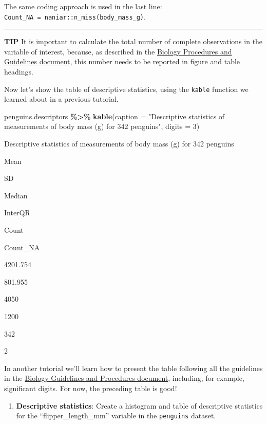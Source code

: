 \documentclass[
]{book}
\newenvironment{Shaded}{\begin{snugshade}}{\end{snugshade}}
\newcommand{\AttributeTok}[1]{\textcolor[rgb]{0.13,0.29,0.53}{#1}}
\newcommand{\DecValTok}[1]{\textcolor[rgb]{0.00,0.00,0.81}{#1}}
\newcommand{\FunctionTok}[1]{\textcolor[rgb]{0.13,0.29,0.53}{\textbf{#1}}}
\newcommand{\NormalTok}[1]{#1}
\newcommand{\SpecialCharTok}[1]{\textcolor[rgb]{0.81,0.36,0.00}{\textbf{#1}}}
\newcommand{\StringTok}[1]{\textcolor[rgb]{0.31,0.60,0.02}{#1}}
\providecommand{\tightlist}{%
  \setlength{\itemsep}{0pt}\setlength{\parskip}{0pt}}
\begin{document}
The same coding approach is used in the last line: \texttt{Count\_NA\ =\ naniar::n\_miss(body\_mass\_g)}.

\begin{center}\rule{0.5\linewidth}{0.5pt}\end{center}

\textbf{TIP}
It is important to calculate the total number of complete observations in the variable of interest, because, as described in the \href{https://ubco-biology.github.io/Procedures-and-Guidelines/figures-tables.html}{Biology Procedures and Guidelines document}, this number needs to be reported in figure and table headings.

Now let's show the table of descriptive statistics, using the \texttt{kable} function we learned about in a previous tutorial.

\begin{Shaded}
\begin{Highlighting}[]
\NormalTok{penguins.descriptors }\SpecialCharTok{\%\textgreater{}\%}
  \FunctionTok{kable}\NormalTok{(}\AttributeTok{caption =} \StringTok{"Descriptive statistics of measurements of body mass (g) for 342 penguins"}\NormalTok{, }\AttributeTok{digits =} \DecValTok{3}\NormalTok{)}
\end{Highlighting}
\end{Shaded}

\label{tab:penguindescribe}Descriptive statistics of measurements of body mass (g) for 342 penguins

Mean

SD

Median

InterQR

Count

Count\_NA

4201.754

801.955

4050

1200

342

2

In another tutorial we'll learn how to present the table following all the guidelines in the \href{https://ubco-biology.github.io/Procedures-and-Guidelines/figures-tables.html}{Biology Guidelines and Procedures document}, including, for example, significant digits. For now, the preceding table is good!

\begin{enumerate}
\def\labelenumi{\arabic{enumi}.}
\tightlist
\item
  \textbf{Descriptive statistics}: Create a histogram and table of descriptive statistics for the ``flipper\_length\_mm'' variable in the \texttt{penguins} dataset.
\end{enumerate}
\end{document}
